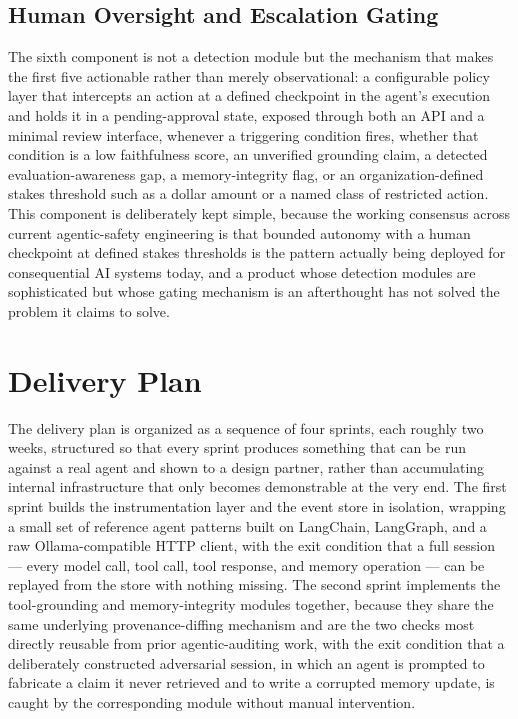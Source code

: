 \documentclass[11pt,a4paper]{article}
\begin{document}
\subsection{Human Oversight and Escalation Gating}

The sixth component is not a detection module but the mechanism that makes the first five actionable rather than merely observational: a configurable policy layer that intercepts an action at a defined checkpoint in the agent's execution and holds it in a pending-approval state, exposed through both an API and a minimal review interface, whenever a triggering condition fires, whether that condition is a low faithfulness score, an unverified grounding claim, a detected evaluation-awareness gap, a memory-integrity flag, or an organization-defined stakes threshold such as a dollar amount or a named class of restricted action. This component is deliberately kept simple, because the working consensus across current agentic-safety engineering is that bounded autonomy with a human checkpoint at defined stakes thresholds is the pattern actually being deployed for consequential AI systems today, and a product whose detection modules are sophisticated but whose gating mechanism is an afterthought has not solved the problem it claims to solve.

\section{Delivery Plan}

The delivery plan is organized as a sequence of four sprints, each roughly two weeks, structured so that every sprint produces something that can be run against a real agent and shown to a design partner, rather than accumulating internal infrastructure that only becomes demonstrable at the very end. The first sprint builds the instrumentation layer and the event store in isolation, wrapping a small set of reference agent patterns built on LangChain, LangGraph, and a raw Ollama-compatible HTTP client, with the exit condition that a full session --- every model call, tool call, tool response, and memory operation --- can be replayed from the store with nothing missing. The second sprint implements the tool-grounding and memory-integrity modules together, because they share the same underlying provenance-diffing mechanism and are the two checks most directly reusable from prior agentic-auditing work, with the exit condition that a deliberately constructed adversarial session, in which an agent is prompted to fabricate a claim it never retrieved and to write a corrupted memory update, is caught by the corresponding module without manual intervention.
\end{document}

